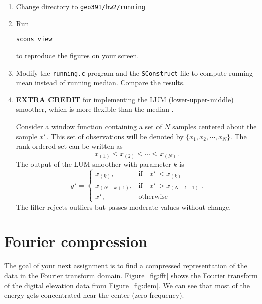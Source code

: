 \begin{enumerate}
\item Change directory to \verb#geo391/hw2/running#
\item Run 
\begin{verbatim}
scons view
\end{verbatim}
to reproduce the figures on your screen.
\item Modify the \texttt{running.c} program and the \texttt{SConstruct} file to compute running mean instead of running median. Compare the results.
\item \textbf{EXTRA CREDIT} for implementing the LUM (lower-upper-middle) smoother, which is more flexible than the median \cite[]{Hardie93}. 

Consider a window function containing a set of $N$ samples centered
about the sample $x^{\star}$. This set of
observations will be denoted by $\{x_1,x_2,\cdots,x_N\}$. The
rank-ordered set can be written as
\[
   x_{(1)} \le x_{(2)} \le \cdots \le x_{(N)}\,.
\]
The output of the LUM
smoother with parameter $k$ is 
\begin{equation}
    y^{\star} = \left\{
\begin{array}{ll} x_{(k)}, & \mbox{if}\quad x^{\star} < x_{(k)} \\ 
x_{(N-k+1)}, & \mbox{if}\quad x^{\star} > x_{(N-l+1)}  \\ 
x^{\star}, & \mbox{otherwise}
\end{array} \right..
  \label{eq:lumsm} 
\end{equation}
The filter rejects outliers but passes moderate values without change.

\end{enumerate}

\lstset{language=python,numbers=left,numberstyle=\tiny,showstringspaces=false}


\section{Fourier compression}


The goal of your next assignment is to find a compressed
representation of the data in the Fourier transform
domain. Figure~\ref{fig:fft} shows the Fourier transform of the
digital elevation data from Figure~\ref{fig:dem}. We can see that most
of the energy gets concentrated near the center (zero frequency).

